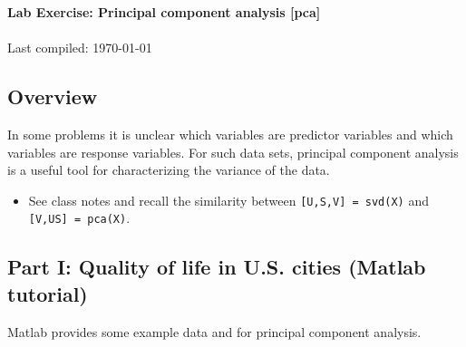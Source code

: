 \documentclass[11pt,titlepage,fleqn]{article}
\begin{document}

\begin{spacing}{1.2}
\centering
{\large \bf Lab Exercise: Principal component analysis [pca]} \\
\cltag\ \\
Last compiled: \today
\end{spacing}


\subsection*{Overview}

In some problems it is unclear which variables are predictor variables and which variables are response variables. For such data sets, principal component analysis is a useful tool for characterizing the variance of the data.

\begin{itemize}
\item See class notes and recall the similarity between \verb+[U,S,V] = svd(X)+ and \verb+[V,US] = pca(X)+.


\end{itemize}


\subsection*{Part I: Quality of life in U.S. cities (Matlab tutorial)}

Matlab provides some example data and for principal component analysis.
\end{document}
